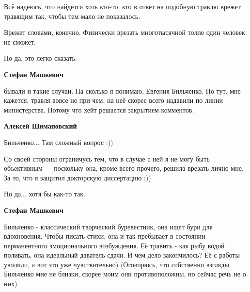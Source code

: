 \begin{itemize}
Всё надеюсь, что найдется хоть кто-то, кто в ответ на подобную травлю врежет
травящим так, чтобы тем мало не показалось.

Врежет словами, конечно. Физически врезать многотысячной толпе один человек не
сможет.

Но да, это легко сказать.

\begin{itemize}
 
\textbf{Стефан Машкевич} 

бывали и такие случаи. На сколько я понимаю, Евгения Бильченко. Но тут, мне
кажется, травля вовсе не при чем, на неё скорее всего надавили по линии
министерства. Потому что хейт решается закрытием комментов.


 
\textbf{Алексей Шимановский} 

Бильченко... Там сложный вопрос :))

Со своей стороны ограничусь тем, что в случае с ней я не могу быть объективным
— поскольку она, кроме всего прочего, решила врезать лично мне. За то, что я
защитил докторскую диссертацию :))

Но да... хотя бы как-то так.



 
\textbf{Стефан Машкевич} 

Бильченко - классический творческий буревестник, она ищет бури для вдохновения.
Чтобы писать стихи, она и так пребывает в состоянии перманентного
эмоционального возбуждения. Её травить - как рыбу водой поливать, она идеальный
даватель сдачи. И чем дело закончилось? Её с работы уволили, а вот это уже
чувствительно) (Оговорюсь, что собственно взгляды Бильченко мне не близки,
скорее моим они противоположны, но сейчас речь не о них)


\end{itemize}
\end{itemize}
